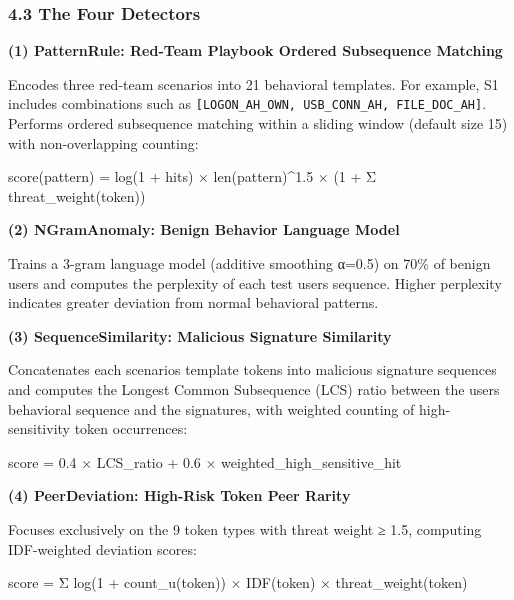 \documentclass[
  a4paper,
  11pt]{article}
\newenvironment{Shaded}{}{}
\newcommand{\NormalTok}[1]{#1}
\begin{document}
\subsubsection{4.3 The Four Detectors}\label{43-the-four-detectors}

\textbf{(1) PatternRule: Red-Team Playbook Ordered Subsequence Matching}

Encodes three red-team scenarios into 21 behavioral templates. For
example, S1 includes combinations such as
\texttt{{[}LOGON\_AH\_OWN,\ USB\_CONN\_AH,\ FILE\_DOC\_AH{]}}. Performs
ordered subsequence matching within a sliding window (default size 15)
with non-overlapping counting:

\begin{Shaded}
\begin{Highlighting}[]
\NormalTok{score(pattern) = log(1 + hits) × len(pattern)\^{}1.5 × (1 + Σ threat\_weight(token))}
\end{Highlighting}
\end{Shaded}

\textbf{(2) NGramAnomaly: Benign Behavior Language Model}

Trains a 3-gram language model (additive smoothing α=0.5) on 70\% of
benign users and computes the perplexity of each test
user\textquotesingle s sequence. Higher perplexity indicates greater
deviation from normal behavioral patterns.

\textbf{(3) SequenceSimilarity: Malicious Signature Similarity}

Concatenates each scenario\textquotesingle s template tokens into
malicious signature sequences and computes the Longest Common
Subsequence (LCS) ratio between the user\textquotesingle s behavioral
sequence and the signatures, with weighted counting of high-sensitivity
token occurrences:

\begin{Shaded}
\begin{Highlighting}[]
\NormalTok{score = 0.4 × LCS\_ratio + 0.6 × weighted\_high\_sensitive\_hit}
\end{Highlighting}
\end{Shaded}

\textbf{(4) PeerDeviation: High-Risk Token Peer Rarity}

Focuses exclusively on the 9 token types with threat weight ≥ 1.5,
computing IDF-weighted deviation scores:

\begin{Shaded}
\begin{Highlighting}[]
\NormalTok{score = Σ log(1 + count\_u(token)) × IDF(token) × threat\_weight(token)}
\end{Highlighting}
\end{Shaded}
\end{document}
